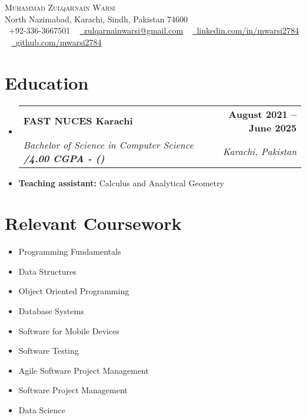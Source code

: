 \documentclass[letterpaper,11pt]{article}
\makeatletter
\newcommand{\resumeItem}[1]{
  \item\small{
    {#1 \vspace{-2pt}}
  }
}
\newcommand{\resumeSubheading}[4]{
  \vspace{-2pt}\item
    \begin{tabular*}{1.0\textwidth}[t]{l@{\extracolsep{\fill}}r}
      \textbf{#1} & \textbf{\small #2} \\
      \textit{\small#3} & \textit{\small #4} \\
    \end{tabular*}\vspace{-7pt}
}
\newcommand{\resumeSubHeadingListStart}{\begin{itemize}[leftmargin=0.0in, label={}]}
\newcommand{\resumeSubHeadingListEnd}{\end{itemize}}
\makeatother
\begin{document}
\begin{center}
    {\Huge \scshape Muhammad Zulqarnain Warsi} \\ \vspace{1pt}
    North Nazimabad, Karachi, Sindh, Pakistan 74600 \\ \vspace{1pt}
    \small \raisebox{-0.1\height}\faPhone\ +92-336-3667501 ~ \href{mailto:zulqarnainwarsi@gmail.com}{\raisebox{-0.2\height}\faEnvelope\  \underline{zulqarnainwarsi@gmail.com}} ~ 
    \href{https://linkedin.com/in/mwarsi2784/}{\raisebox{-0.2\height}\faLinkedin\ \underline{linkedin.com/in/mwarsi2784}}  ~
    \href{https://github.com/mwarsi2784}{\raisebox{-0.2\height}\faGithub\ \underline{github.com/mwarsi2784}}
    \vspace{-8pt}
\end{center}


\section{Education}
  \resumeSubHeadingListStart
    \resumeSubheading
      {FAST NUCES Karachi}{August 2021 -- June 2025}
      {Bachelor of Science in Computer Science \textbf{ \cgpa/4.00 CGPA - (\percentage)}}{Karachi, Pakistan}
      \resumeItem{\textbf{Teaching assistant:} Calculus and Analytical Geometry}
  \resumeSubHeadingListEnd


\section{Relevant Coursework}
    \begin{multicols}{3}
        \begin{itemize}[itemsep=-5pt, parsep=3pt]
            \item \small Programming Fundamentals
            \item \small Data Structures
            \item \small Object Oriented Programming
            \item \small Database Systems	
            \item \small Software for Mobile Devices
            \item \small Software Testing
            \item \small Agile Software Project Management
            \item \small Software Project Management
            \item \small Data Science
        \end{itemize}
    \end{multicols}
    \vspace*{2.0\multicolsep}
\end{document}

